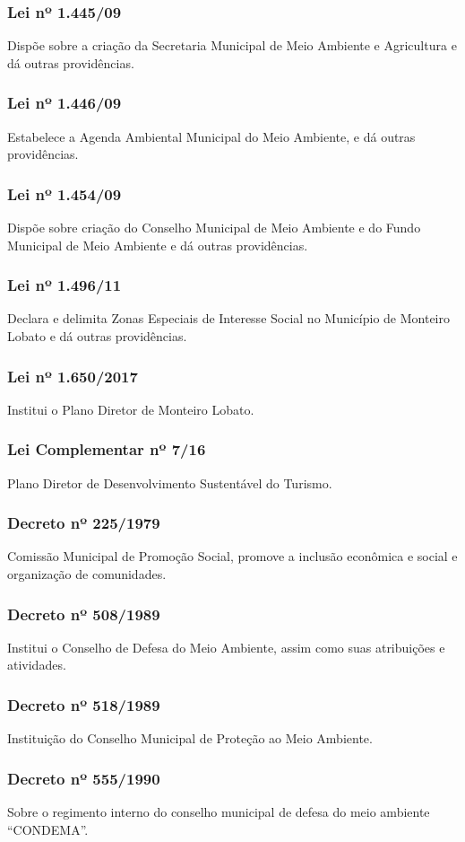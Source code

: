 \begin{subapend}
\begin{subsubapend}
		\subsubsection{Lei nº 1.445/09}
		Dispõe sobre a criação da Secretaria Municipal de Meio Ambiente e Agricultura e dá outras providências.
		\subsubsection{Lei nº 1.446/09}
		Estabelece a Agenda Ambiental Municipal do Meio Ambiente, e dá outras providências.
		\subsubsection{Lei nº 1.454/09}
		Dispõe sobre criação do Conselho Municipal de Meio Ambiente e do Fundo Municipal de Meio Ambiente e dá outras providências.
		\subsubsection{Lei nº 1.496/11}
		Declara e delimita Zonas Especiais de Interesse Social no Município de Monteiro Lobato e dá outras providências.
		\subsubsection{Lei nº 1.650/2017}
		Institui o Plano Diretor de Monteiro Lobato.
		\subsubsection{Lei Complementar nº 7/16}
		Plano Diretor de Desenvolvimento Sustentável do Turismo.
		\subsubsection{Decreto nº 225/1979}
		Comissão Municipal de Promoção Social, promove a inclusão econômica e social e organização de comunidades.
		\subsubsection{Decreto nº 508/1989}
		Institui o Conselho de Defesa do Meio Ambiente, assim como suas atribuições e atividades.
		\subsubsection{Decreto nº 518/1989}
		Instituição do Conselho Municipal de Proteção ao Meio Ambiente.
		\subsubsection{Decreto nº 555/1990}
		Sobre o regimento interno do conselho municipal de defesa do meio ambiente “CONDEMA”.

\end{subsubapend}
\end{subapend}
